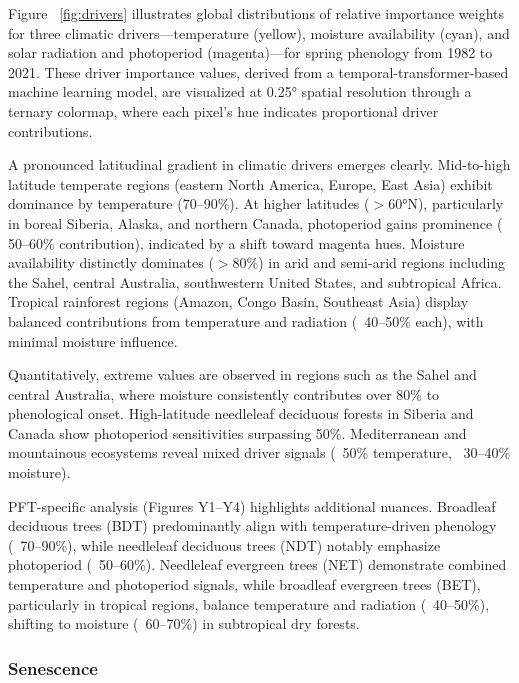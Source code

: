 \documentclass[pdflatex,sn-mathphys-num]{sn-jnl}%
\theoremstyle{thmstyleone}%
\theoremstyle{thmstyletwo}%
\theoremstyle{thmstylethree}%
\begin{document}
Figure ~\ref {fig:drivers} illustrates global distributions of relative importance weights for three climatic drivers—temperature (yellow), moisture availability (cyan), and solar radiation and photoperiod (magenta)—for spring phenology from 1982 to 2021. These driver importance values, derived from a temporal-transformer-based machine learning model, are visualized at 0.25° spatial resolution through a ternary colormap, where each pixel's hue indicates proportional driver contributions.

A pronounced latitudinal gradient in climatic drivers emerges clearly. Mid-to-high latitude temperate regions (eastern North America, Europe, East Asia) exhibit dominance by temperature (70–90\%). At higher latitudes ($>$60°N), particularly in boreal Siberia, Alaska, and northern Canada, photoperiod gains prominence ($~$50–60\% contribution), indicated by a shift toward magenta hues. Moisture availability distinctly dominates ($>$80\%) in arid and semi-arid regions including the Sahel, central Australia, southwestern United States, and subtropical Africa. Tropical rainforest regions (Amazon, Congo Basin, Southeast Asia) display balanced contributions from temperature and radiation (~40–50\% each), with minimal moisture influence.

Quantitatively, extreme values are observed in regions such as the Sahel and central Australia, where moisture consistently contributes over 80\% to phenological onset. High-latitude needleleaf deciduous forests in Siberia and Canada show photoperiod sensitivities surpassing 50\%. Mediterranean and mountainous ecosystems reveal mixed driver signals (~50\% temperature, ~30–40\% moisture).

PFT-specific analysis (Figures Y1–Y4) highlights additional nuances. Broadleaf deciduous trees (BDT) predominantly align with temperature-driven phenology (~70–90\%), while needleleaf deciduous trees (NDT) notably emphasize photoperiod (~50–60\%). Needleleaf evergreen trees (NET) demonstrate combined temperature and photoperiod signals, while broadleaf evergreen trees (BET), particularly in tropical regions, balance temperature and radiation (~40–50\%), shifting to moisture (~60–70\%) in subtropical dry forests.



\subsubsection{Senescence}\label{subsubsec2}
\end{document}
